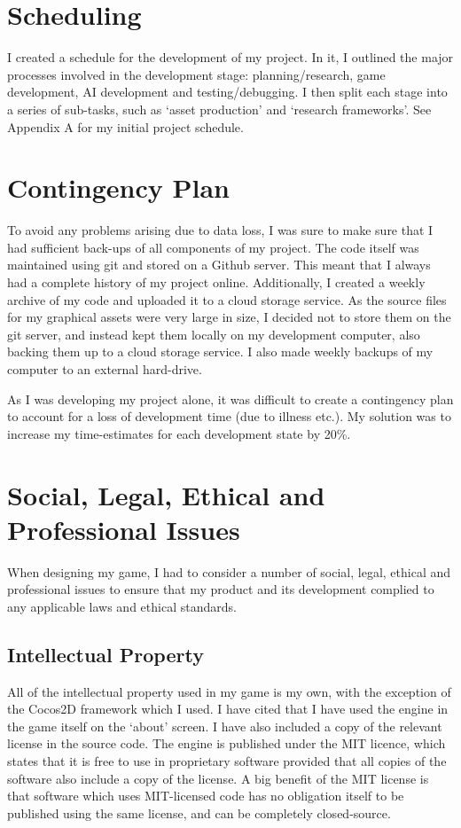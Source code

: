 \documentclass[a4paper,oneside]{report}
\begin{document}
\newpage
\section{Scheduling}

I created a schedule for the development of my project. In it, I outlined the major processes involved in the development stage: planning/research, game development, AI development and testing/debugging. I then split each stage into a series of sub-tasks, such as `asset production' and `research frameworks'. See Appendix A for my initial project schedule.

\section{Contingency Plan}

To avoid any problems arising due to data loss, I was sure to make sure that I had sufficient back-ups of all components of my project. The code itself was maintained using git and stored on a Github server. This meant that I always had a complete history of my project online. Additionally, I created a weekly archive of my code and uploaded it to a cloud storage service. As the source files for my graphical assets were very large in size, I decided not to store them on the git server, and instead kept them locally on my development computer, also backing them up to a cloud storage service. I also made weekly backups of my computer to an external hard-drive.

As I was developing my project alone, it was difficult to create a contingency plan to account for a loss of development time (due to illness etc.). My solution was to increase my time-estimates for each development state by 20\%.
	
\section{Social, Legal, Ethical and Professional Issues}

When designing my game, I had to consider a number of social, legal, ethical and professional issues to ensure that my product and its development complied to any applicable laws and ethical standards.

\subsection{Intellectual Property}

All of the intellectual property used in my game is my own, with the exception of the Cocos2D framework which I used. I have cited that I have used the engine in the game itself on the `about' screen. I have also included a copy of the relevant license in the source code. The engine is published under the MIT licence, which states that it is free to use in proprietary software provided that all copies of the software also include a copy of the license. A big benefit of the MIT license is that software which uses MIT-licensed code has no obligation itself to be published using the same license, and can be completely closed-source.
\end{document}
